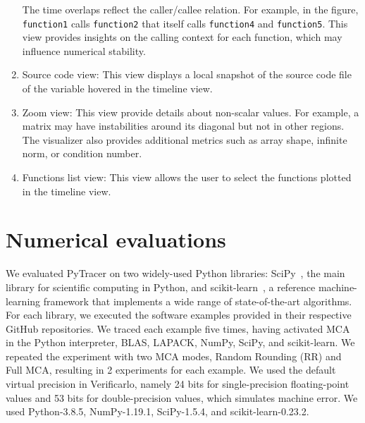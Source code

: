 \documentclass[11pt]{article}
\newcommand{\tristan}[1]{\color{orange}\textbf{From Tristan:} #1\color{black}\xspace}
\newcommand{\gkmod}[2]{\color{purple}\sout{#1} #2\color{black}\xspace}
\newcommand{\Yohan}[1]{\color{green!75!black}\textbf{Yohan:} #1\color{black}\xspace}
\newcommand{\pytracer}[0]{PyTracer\xspace}
\begin{document}
\begin{enumerate}
    The time overlaps reflect the caller/callee relation.
    For example, in the figure, \texttt{function1} calls \texttt{function2} that itself calls \texttt{function4} and \texttt{function5}. 
    This view provides insights on the calling context for each function, which may influence numerical stability.
 \item  Source code view: This view displays a local snapshot of the source code file of the variable hovered in the timeline view. 
 \item Zoom view: This view provide details about non-scalar values. For example, a matrix may have instabilities around its diagonal but not in other regions.
    The visualizer also provides additional metrics such as array shape, infinite norm, or condition number.
\item  Functions list view: This view allows the user to select the functions plotted in the timeline view.
\end{enumerate}

\section{Numerical evaluations}

We evaluated \pytracer on two widely-used Python libraries: SciPy~\cite{virtanen2020scipy}, the main library for scientific computing in Python, and  scikit-learn~\cite{pedregosa2011scikit}, a reference machine-learning framework that
 implements a wide range of state-of-the-art algorithms. For each library, we executed the software examples provided in their respective GitHub repositories. We traced each example five times, having activated MCA in the Python interpreter, BLAS, LAPACK, NumPy, SciPy, and scikit-learn. We repeated the experiment with two MCA modes, Random Rounding (RR) and Full MCA, resulting in 2 experiments for each example. We used the default virtual precision in Verificarlo, namely 24 bits for single-precision floating-point values and 53 bits for double-precision values, which simulates machine error. We used Python-3.8.5, NumPy-1.19.1, SciPy-1.5.4, and scikit-learn-0.23.2.
\end{document}
